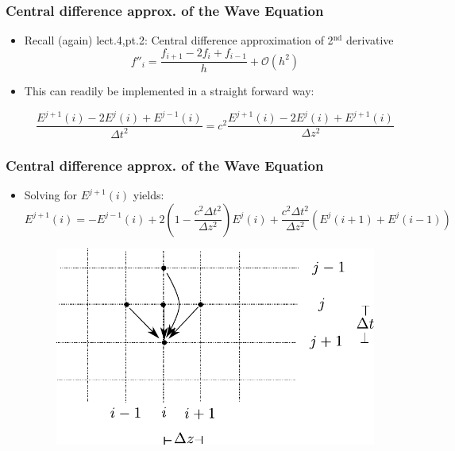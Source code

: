 \documentclass[ignorenonframetext]{beamer}
\begin{document}
\begin{frame}
\frametitle{Central difference approx. of the Wave Equation}
\begin{itemize}
\item Recall (again) lect.4,pt.2: Central difference approximation of 2$^{\mathrm{nd}}$ derivative
\begin{equation}
f''_i = \frac{f_{i+1} - 2 f_i + f_{i-1}}{h} + \mathcal{O}(h^2)
\end{equation}


\item This can readily be implemented in a straight forward way:

\begin{equation}
\frac{E^{j+1}(i)-2E^{j}(i)+E^{j-1}(i)}{\Delta t^2} = c^2\frac{E^{j+1}(i)-2E^{j}(i)+E^{j+1}(i) }{\Delta z^2}
\end{equation}

\end{itemize}
\end{frame}

\begin{frame}
\frametitle{Central difference approx. of the Wave Equation}
\begin{itemize}
\item Solving for $E^{j+1}(i)$ yields:
\begin{equation}
E^{j+1}(i)=-E^{j-1}(i)+2(1-\frac{c^2\Delta t^2}{\Delta z^2})E^{j}(i)+\frac{c^2\Delta t^2}{\Delta z^2}(E^{j}(i+1)+E^{j}(i-1))
\end{equation}
\begin{figure}
\centering
\includegraphics[width=0.6\linewidth]{wave_mesh}
\label{fig:yee_mesh}
\end{figure}
\end{itemize}
\end{frame}
\end{document}
